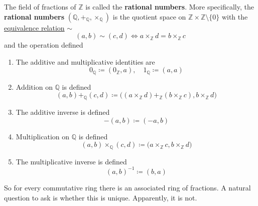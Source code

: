   \begin{definition}
    \label{def:rational-numbers}
    The field of fractions of $\mathbb{Z}$ is called the \textbf{rational numbers}. More specifically, the \textbf{rational numbers} $(\mathbb{Q}, +_{\mathbb{Q}}, \times_{\mathbb{Q}})$ is the quotient space on $\mathbb{Z} \times \mathbb{Z} \setminus \{0\}$ with the \hyperref[st-def:equivalence_relation]{equivalence relation} $\sim$ 
    \begin{equation}
      (a, b) \sim (c, d) \iff a \times_{\mathbb{Z}} d = b \times_{\mathbb{Z}} c
    \end{equation} 
    and the operation defined 
    \begin{enumerate}
      \item The additive and multiplicative identities are 
      \begin{equation}
        0_{\mathbb{Q}} \coloneqq (0_{\mathbb{Z}}, a), \quad 1_{\mathbb{Q}} \coloneqq (a, a)
      \end{equation}

      \item Addition on $\mathbb{Q}$ is defined 
      \begin{equation}
        (a, b) +_{\mathbb{Q}} (c, d) \coloneqq \big( (a \times_{\mathbb{Z}} d) +_{\mathbb{Z}} (b \times_{\mathbb{Z}} c), b \times_{\mathbb{Z}} d \big) 
      \end{equation}

      \item The additive inverse is defined 
      \begin{equation}
        -(a, b) \coloneqq (-a, b)
      \end{equation}

      \item Multiplication on $\mathbb{Q}$ is defined 
      \begin{equation}
        (a, b) \times_{\mathbb{Q}} (c, d) \coloneqq \big( a \times_{\mathbb{Z}} c, b \times_{\mathbb{Z}} d \big)
      \end{equation} 

      \item The multiplicative inverse is defined 
      \begin{equation}
        (a, b)^{-1} \coloneqq (b, a)
      \end{equation}
    \end{enumerate}
  \end{definition}

  So for every commutative ring there is an associated ring of fractions. A natural question to ask is whether this is unique. Apparently, it is not. 

